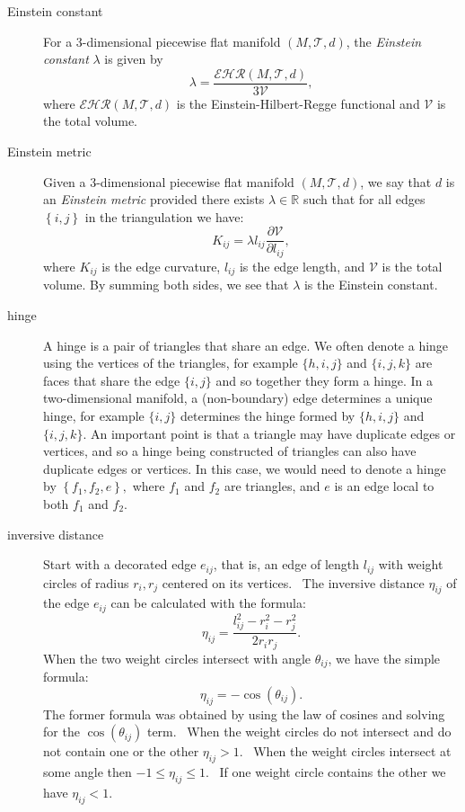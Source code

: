 \begin{description}
\item[Einstein constant] For a 3-dimensional piecewise flat manifold $\left(
M,\mathcal{T},d\right) $, the \textit{Einstein constant} $\lambda $ is given
by%
\[
\lambda =\frac{\mathcal{EHR}\left( M,\mathcal{T},d\right) }{3\mathcal{V}}, 
\]%
where $\mathcal{EHR}\left( M,\mathcal{T},d\right) $ is the
Einstein-Hilbert-Regge functional and $\mathcal{V}$ is the total volume.

\item[Einstein metric] Given a 3-dimensional piecewise flat manifold $\left(
M,\mathcal{T},d\right) $, we say that $d$ is an \textit{Einstein metric}
provided there exists $\lambda \in \mathbb{R}$ such that for all edges $%
\left\{ i,j\right\} $ in the triangulation we have:%
\[
K_{ij}=\lambda l_{ij}\frac{\partial \mathcal{V}}{\partial l_{ij}}, 
\]%
where $K_{ij}$ is the edge curvature, $l_{ij}$ is the edge length, and $%
\mathcal{V}$ is the total volume. By summing both sides, we see that $%
\lambda $ is the Einstein constant.

\item[hinge] A hinge is a pair of triangles that share an edge. We often
denote a hinge using the vertices of the triangles, for example $\{h,i,j\}$
and $\{i,j,k\}$ are faces that share the edge $\{i,j\}$ and so together they
form a hinge. In a two-dimensional manifold, a (non-boundary) edge
determines a unique hinge, for example $\{i,j\}$ determines the hinge formed
by $\{h,i,j\}$ and $\{i,j,k\}$. An important point is that a triangle may
have duplicate edges or vertices, and so a hinge being constructed of
triangles can also have duplicate edges or vertices. In this case, we would
need to denote a hinge by $\left\{ f_{1},f_{2},e\right\} ,$ where $f_{1}$
and $f_{2}$ are triangles, and $e$ is an edge local to both $f_{1}$ and $%
f_{2}.$

\item[inversive distance] Start with a decorated edge $e_{ij}$, that is, an
edge of length $l_{ij}$ with weight circles of radius $r_{i},r_{j}$ centered
on its vertices. \ The inversive distance $\eta _{ij}$ of the edge $e_{ij}$
can be calculated with the formula:%
\[
\eta _{ij}=\frac{l_{ij}^{2}-r_{i}^{2}-r_{j}^{2}}{2r_{i}r_{j}}. 
\]%
When the two weight circles intersect with angle $\theta _{ij}$, we have the
simple formula:%
\[
\eta _{ij}=-\cos \left( \theta _{ij}\right) . 
\]%
The former formula was obtained by using the law of cosines and solving for
the $\cos \left( \theta _{ij}\right) $ term. \ When the weight circles do
not intersect and do not contain one or the other $\eta _{ij}>1$. \ When the
weight circles intersect at some angle then $-1\leq \eta _{ij}\leq 1$. \ If
one weight circle contains the other we have $\eta _{ij}<1$. \ 


\end{description}
